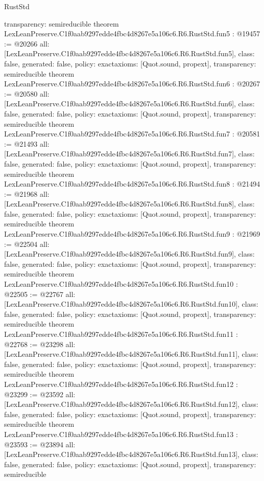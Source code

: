 \begin{lexlean}{RustStd}
\begin{coremodule}
{  transparency: semireducible
}
theorem LexLeanPreserve.C1f0aab9297edde4fbc4d8267e5a106c6.R6.RustStd.fun5 : @19457 := @20266 {
  all: [LexLeanPreserve.C1f0aab9297edde4fbc4d8267e5a106c6.R6.RustStd.fun5],
  class: false,
  generated: false,
  policy: exact{axioms: [Quot.sound, propext]},
  transparency: semireducible
}
theorem LexLeanPreserve.C1f0aab9297edde4fbc4d8267e5a106c6.R6.RustStd.fun6 : @20267 := @20580 {
  all: [LexLeanPreserve.C1f0aab9297edde4fbc4d8267e5a106c6.R6.RustStd.fun6],
  class: false,
  generated: false,
  policy: exact{axioms: [Quot.sound, propext]},
  transparency: semireducible
}
theorem LexLeanPreserve.C1f0aab9297edde4fbc4d8267e5a106c6.R6.RustStd.fun7 : @20581 := @21493 {
  all: [LexLeanPreserve.C1f0aab9297edde4fbc4d8267e5a106c6.R6.RustStd.fun7],
  class: false,
  generated: false,
  policy: exact{axioms: [Quot.sound, propext]},
  transparency: semireducible
}
theorem LexLeanPreserve.C1f0aab9297edde4fbc4d8267e5a106c6.R6.RustStd.fun8 : @21494 := @21968 {
  all: [LexLeanPreserve.C1f0aab9297edde4fbc4d8267e5a106c6.R6.RustStd.fun8],
  class: false,
  generated: false,
  policy: exact{axioms: [Quot.sound, propext]},
  transparency: semireducible
}
theorem LexLeanPreserve.C1f0aab9297edde4fbc4d8267e5a106c6.R6.RustStd.fun9 : @21969 := @22504 {
  all: [LexLeanPreserve.C1f0aab9297edde4fbc4d8267e5a106c6.R6.RustStd.fun9],
  class: false,
  generated: false,
  policy: exact{axioms: [Quot.sound, propext]},
  transparency: semireducible
}
theorem LexLeanPreserve.C1f0aab9297edde4fbc4d8267e5a106c6.R6.RustStd.fun10 : @22505 := @22767 {
  all: [LexLeanPreserve.C1f0aab9297edde4fbc4d8267e5a106c6.R6.RustStd.fun10],
  class: false,
  generated: false,
  policy: exact{axioms: [Quot.sound, propext]},
  transparency: semireducible
}
theorem LexLeanPreserve.C1f0aab9297edde4fbc4d8267e5a106c6.R6.RustStd.fun11 : @22768 := @23298 {
  all: [LexLeanPreserve.C1f0aab9297edde4fbc4d8267e5a106c6.R6.RustStd.fun11],
  class: false,
  generated: false,
  policy: exact{axioms: [Quot.sound, propext]},
  transparency: semireducible
}
theorem LexLeanPreserve.C1f0aab9297edde4fbc4d8267e5a106c6.R6.RustStd.fun12 : @23299 := @23592 {
  all: [LexLeanPreserve.C1f0aab9297edde4fbc4d8267e5a106c6.R6.RustStd.fun12],
  class: false,
  generated: false,
  policy: exact{axioms: [Quot.sound, propext]},
  transparency: semireducible
}
theorem LexLeanPreserve.C1f0aab9297edde4fbc4d8267e5a106c6.R6.RustStd.fun13 : @23593 := @23894 {
  all: [LexLeanPreserve.C1f0aab9297edde4fbc4d8267e5a106c6.R6.RustStd.fun13],
  class: false,
  generated: false,
  policy: exact{axioms: [Quot.sound, propext]},
  transparency: semireducible
}
\end{coremodule}
\end{lexlean}
